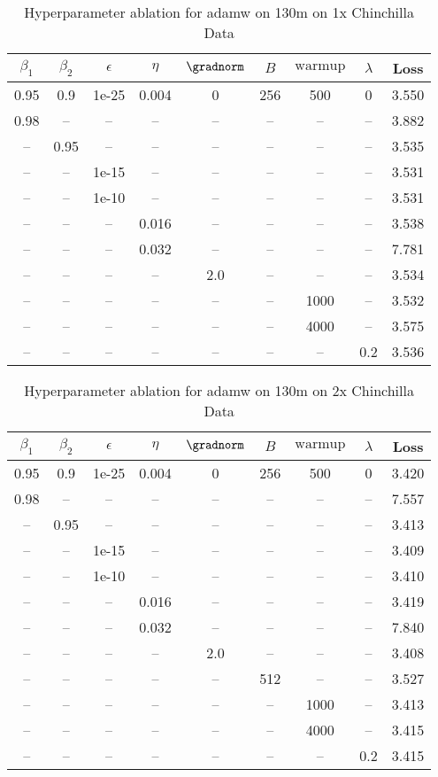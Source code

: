 \begin{table}[h!]
\centering
\caption{Hyperparameter ablation for adamw on 130m on 1x Chinchilla Data}
\label{tab:ablation_adamw_130m_on_1x_chinchilla_data}
\begin{tabular}{ccccccccc}
\toprule
$\beta_1$ & $\beta_2$ & $\epsilon$ & $\eta$ & $\gradnorm$ & $B$ & $\mathrm{warmup}$ & $\lambda$ & Loss \\
\midrule
0.95 & 0.9 & 1e-25 & 0.004 & 0 & 256 & 500 & 0 & 3.550 \\
\midrule
0.98 & -- & -- & -- & -- & -- & -- & -- & 3.882 \\
-- & 0.95 & -- & -- & -- & -- & -- & -- & 3.535 \\
-- & -- & 1e-15 & -- & -- & -- & -- & -- & 3.531 \\
-- & -- & 1e-10 & -- & -- & -- & -- & -- & 3.531 \\
-- & -- & -- & 0.016 & -- & -- & -- & -- & 3.538 \\
-- & -- & -- & 0.032 & -- & -- & -- & -- & 7.781 \\
-- & -- & -- & -- & 2.0 & -- & -- & -- & 3.534 \\
-- & -- & -- & -- & -- & -- & 1000 & -- & 3.532 \\
-- & -- & -- & -- & -- & -- & 4000 & -- & 3.575 \\
-- & -- & -- & -- & -- & -- & -- & 0.2 & 3.536 \\
\bottomrule
\end{tabular}
\end{table}

\begin{table}[h!]
\centering
\caption{Hyperparameter ablation for adamw on 130m on 2x Chinchilla Data}
\label{tab:ablation_adamw_130m_on_2x_chinchilla_data}
\begin{tabular}{ccccccccc}
\toprule
$\beta_1$ & $\beta_2$ & $\epsilon$ & $\eta$ & $\gradnorm$ & $B$ & $\mathrm{warmup}$ & $\lambda$ & Loss \\
\midrule
0.95 & 0.9 & 1e-25 & 0.004 & 0 & 256 & 500 & 0 & 3.420 \\
\midrule
0.98 & -- & -- & -- & -- & -- & -- & -- & 7.557 \\
-- & 0.95 & -- & -- & -- & -- & -- & -- & 3.413 \\
-- & -- & 1e-15 & -- & -- & -- & -- & -- & 3.409 \\
-- & -- & 1e-10 & -- & -- & -- & -- & -- & 3.410 \\
-- & -- & -- & 0.016 & -- & -- & -- & -- & 3.419 \\
-- & -- & -- & 0.032 & -- & -- & -- & -- & 7.840 \\
-- & -- & -- & -- & 2.0 & -- & -- & -- & 3.408 \\
-- & -- & -- & -- & -- & 512 & -- & -- & 3.527 \\
-- & -- & -- & -- & -- & -- & 1000 & -- & 3.413 \\
-- & -- & -- & -- & -- & -- & 4000 & -- & 3.415 \\
-- & -- & -- & -- & -- & -- & -- & 0.2 & 3.415 \\
\bottomrule
\end{tabular}
\end{table}

